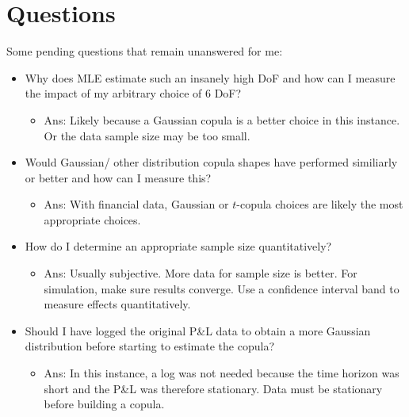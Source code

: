 \documentclass[titlepage]{article}
\begin{document}
\section{Questions}
Some pending questions that remain unanswered for me:
\begin{itemize}
	\item Why does MLE estimate such an insanely high DoF and how can I measure the impact of my arbitrary choice of 6 DoF?
	\begin{itemize}
		\item Ans: Likely because a Gaussian copula is a better choice in this instance. Or the data sample size may be too small. 
	\end{itemize}
	\item Would Gaussian/ other distribution copula shapes have performed similiarly or better and how can I measure this?
	\begin{itemize}
		\item Ans: With financial data, Gaussian or $t$-copula choices are likely the most appropriate choices. 
	\end{itemize}
	\item How do I determine an appropriate sample size quantitatively?
	\begin{itemize}
		\item Ans: Usually subjective. More data for sample size is better. For simulation, make sure results converge. Use a confidence interval band to measure effects quantitatively.
	\end{itemize}	
	\item Should I have logged the original P\&L data to obtain a more Gaussian distribution before starting to estimate the copula?
	\begin{itemize}
		\item Ans: In this instance, a log was not needed because the time horizon was short and the P\&L was therefore stationary. Data must be stationary before building a copula.
	\end{itemize}	
\end{itemize}

%
% 
\end{document}
